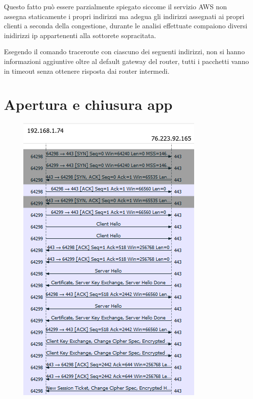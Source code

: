 \documentclass{article}
\begin{document}
Questo fatto può essere parzialmente spiegato siccome il servizio AWS non assegna staticamente i propri indirizzi ma adegua gli indirizzi
assegnati ai propri clienti a seconda della congestione, durante le analisi effettuate compaiono diversi inidirizzi ip appartenenti alla sottorete sopracitata.

Esegendo il comando traceroute con ciascuno dei seguenti indirizzi, non si hanno informazioni aggiuntive oltre al default gateway del router, 
tutti i pacchetti vanno in timeout senza ottenere risposta dai router intermedi.

\section{Apertura e chiusura app}

\begin{figure}[!htb]
  \begin{minipage}{0.3\textwidth}
      \centering
      \includegraphics[width=0.9\linewidth]{flusso1.png}

\end{minipage}
\end{figure}
\end{document}
